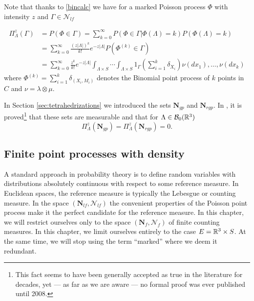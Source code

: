 
Note that thanks to \ref{bincalc} we have for a marked Poisson process $\Phi$ with intensity $z$ and $\Gamma \in \mathcal N_{lf}$ 

\begin{align}\label{eq:poiscalc}
	\Pi^z_\Lambda(\Gamma) &= P(\Phi \in \Gamma) = \sum^\infty_{k=0} P(\Phi \in \Gamma | \Phi(\Lambda) = k) P(\Phi(\Lambda)=k) \\
	& = \sum^\infty_{k=0} \frac{(z|\Lambda|)^k}{k!} e^{-z|\Lambda|} P(\Phi^{(k)}\in \Gamma) \nonumber \\ 
	& = \sum^\infty_{k=0} \frac{z^k}{k!} e^{-z|\Lambda|} \int_{\Lambda\times S} \cdots \int_{\Lambda\times S} 1_{\Gamma} \left(\sum^k_{i=1} \delta_{X_i}\right) \nu(dx_1), \dots, \nu(dx_k) \nonumber
\end{align}
where $\Phi^{(k)} = \sum^k_{i=1}\delta_{(X_i,M_i)}$ denotes the Binomial point process of $k$ points in $C$ and $\nu=\lambda \otimes \mu$. 

\begin{remark}
	In Section \ref{sec:tetrahedrizations} we introduced the sets $\mathbf N_{gp}$ and $\mathbf N_{rgp}$. In \cite{Zessin2008}, it is proved\footnote{This fact seems to have been generally accepted as true in the literature for decades, yet --- as far as we are aware --- no formal proof was ever published until 2008.} that these sets are measurable and that for $\Lambda \in \mathcal B_0({\mathbb R^3})$
	$$\Pi^z_{\Lambda}(\mathbf N_{gp}) = \Pi^z_{\Lambda}(\mathbf N_{rgp})=0.$$
\end{remark}

\subsection{Finite point processes with density}
A standard approach in probability theory is to define random variables with distributions absolutely continuous with respect to some reference measure. In Euclidean spaces, the reference measure is typically the Lebesgue or counting measure. In the space $(\mathbf N_{lf},\mathcal N_{lf})$ the convenient properties of the Poisson point process make it the perfect candidate for the reference measure. In this chapter, we will restrict ourselves only to the space $(\mathbf N_f,\mathcal N_f)$ of finite counting measures.
In this chapter, we limit ourselves entirely to the case $E={\mathbb R^3} \times S$. At the same time, we will stop using the term ``marked'' where we deem it redundant. 

